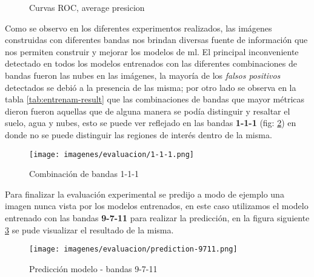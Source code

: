 \begin{figure}[htbp]
\centering
{}
\caption{Curvas ROC, average presicion} \label{fig:Average_precision}
\end{figure}
 
Como se observo en los diferentes experimentos realizados, las imágenes construidas con diferentes bandas nos brindan diversas fuente de información que nos permiten construir y mejorar los modelos de \ac{ml}. El principal inconveniente detectado en todos los modelos entrenados con las diferentes combinaciones de bandas fueron las nubes en las imágenes, la mayoría de los \textit{falsos positivos} detectados se debió a la presencia de las misma; por otro lado se observa en la tabla \ref{tab:entrenam-result} que las combinaciones de bandas que mayor métricas dieron fueron aquellas que de alguna manera se podía distinguir y resaltar el suelo, agua y nubes, esto se puede ver reflejado en las bandas  \textbf{1-1-1} (fig: \ref{Fig:imagen_banda_111}) en donde no se puede distinguir las regiones de interés dentro de la misma. 
 
 \begin{figure}[H]\centering
  \texttt{[image: imagenes/evaluacion/1-1-1.png]}
  \caption{Combinación de bandas 1-1-1} \label{Fig:imagen_banda_111}
\end{figure}
 
Para finalizar la evaluación experimental se predijo a modo de ejemplo una imagen nunca vista por los modelos entrenados, en este caso utilizamos el modelo entrenado con las bandas \textbf{9-7-11} para realizar la predicción, en la figura siguiente  \ref{Fig: TP} se pude visualizar el resultado de la misma.

\begin{figure}[H]\centering
  \texttt{[image: imagenes/evaluacion/prediction-9711.png]}
  \caption{Predicción modelo - bandas 9-7-11} \label{Fig: TP}
\end{figure}














